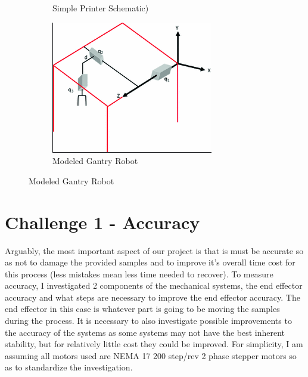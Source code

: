 \documentclass[11pt]{article}
\begin{document}
\begin{figure}[H]
\begin{subfigure}{.3\textwidth}
      \caption{Simple Printer Schematic)}
      \label{fig:printer}
    \end{subfigure}
    \label{fig:test}
    \begin{subfigure}{.3\textwidth}
      \centering
      \includegraphics[width=.7\linewidth]{Gantry_Kinematics.png}
      \caption{Modeled Gantry Robot}
      \label{fig:Gantry}
    \end{subfigure}
    \label{fig:test}
    \end{figure}



\section{Challenge 1 - Accuracy}

Arguably, the most important aspect of our project is that is must be accurate so as not to damage the provided samples and to improve it's overall time cost for this process (less mistakes mean less time needed to recover). To measure accuracy, I investigated 2 components of the mechanical systems, the end effector accuracy and what steps are necessary to improve the end effector accuracy. The end effector in this case is whatever part is going to be moving the samples during the process. It is necessary to also investigate possible improvements to the accuracy of the systems as some systems may not have the best inherent stability, but for relatively little cost they could be improved. For simplicity, I am assuming all motors used are NEMA 17 200 step/rev 2 phase stepper motors \cite{Nema17} so as to standardize the investigation. 
\end{document}
